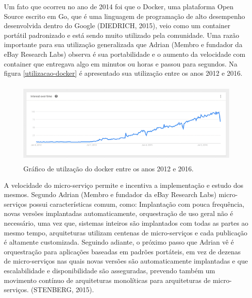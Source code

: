Um fato que ocorreu no ano de 2014 foi que o Docker, uma plataforma Open Source escrito em Go, que é uma linguagem de programação de alto desempenho desenvolvida dentro do Google (DIEDRICH, 2015), veio como um container portátil padronizado e está sendo muito utilizado pela comunidade. Uma razão importante para sua utilização generalizada que Adrian (Membro e fundador da eBay Research Labs)  observa é sua portabilidade e o aumento da velocidade com container que entregava algo em minutos ou horas e passou para segundos. Na figura \ref{utilizacao-docker} é apresentado sua utilização entre os anos 2012 e 2016.



\begin{figure}[h]
\centering
\includegraphics[height=4.2cm]{imagens/docker}
\caption{Gráfico de utilzação do docker entre os anos 2012 e 2016.}
\label{fig:utilizacao-docker}
\end{figure}

A velocidade do micro-serviço permite e incentiva a implementação e estudo dos mesmos. Segundo Adrian (Membro e fundador da eBay Research Labs)  micro-serviços possui características comum, como: Implantação com pouca frequência, novas versões implantadas automaticamente, orquestração de uso geral não é necessário, uma vez que, sistemas inteiros são implantados com todas as partes ao mesmo tempo, arquiteturas utilizam centenas de micro-serviços e cada publicação é altamente customizada.
Seguindo adiante, o próximo passo que Adrian vê é orquestração para aplicações baseadas em padrões portáteis, em vez de dezenas de micro-serviços nas quais novas versões são automaticamente implantadas e que escalabilidade e disponibilidade são asseguradas, prevendo também um movimento contínuo de arquiteturas monolíticas para arquiteturas de micro-serviços. (STENBERG, 2015).

